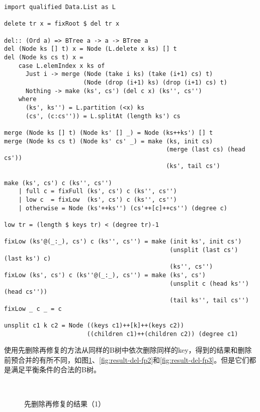 \documentclass[UTF8]{article}
\begin{document}
\lstset{language=Haskell}
\begin{lstlisting}[style=Haskell]
import qualified Data.List as L

delete tr x = fixRoot $ del tr x

del:: (Ord a) => BTree a -> a -> BTree a
del (Node ks [] t) x = Node (L.delete x ks) [] t
del (Node ks cs t) x =
    case L.elemIndex x ks of
      Just i -> merge (Node (take i ks) (take (i+1) cs) t)
                      (Node (drop (i+1) ks) (drop (i+1) cs) t)
      Nothing -> make (ks', cs') (del c x) (ks'', cs'')
    where
      (ks', ks'') = L.partition (<x) ks
      (cs', (c:cs'')) = L.splitAt (length ks') cs

merge (Node ks [] t) (Node ks' [] _) = Node (ks++ks') [] t
merge (Node ks cs t) (Node ks' cs' _) = make (ks, init cs)
                                             (merge (last cs) (head cs'))
                                             (ks', tail cs')

make (ks', cs') c (ks'', cs'')
    | full c = fixFull (ks', cs') c (ks'', cs'')
    | low c  = fixLow  (ks', cs') c (ks'', cs'')
    | otherwise = Node (ks'++ks'') (cs'++[c]++cs'') (degree c)

low tr = (length $ keys tr) < (degree tr)-1

fixLow (ks'@(_:_), cs') c (ks'', cs'') = make (init ks', init cs')
                                              (unsplit (last cs') (last ks') c)
                                              (ks'', cs'')
fixLow (ks', cs') c (ks''@(_:_), cs'') = make (ks', cs')
                                              (unsplit c (head ks'') (head cs''))
                                              (tail ks'', tail cs'')
fixLow _ c _ = c

unsplit c1 k c2 = Node ((keys c1)++[k]++(keys c2))
                       ((children c1)++(children c2)) (degree c1)
\end{lstlisting}

使用先删除再修复的方法从同样的B树中依次删除同样的key，得到的结果和删除前预合并的有所不同，如图\ref{fig:result-del-fp1}、\ref{fig:result-del-fp2}和\ref{fig:result-del-fp3}。但是它们都是满足平衡条件的合法的B树。

\begin{figure}[htbp]
  \centering
  \\
  \caption{先删除再修复的结果（1）} \label{fig:result-del-fp1}
\end{figure}
\end{document}
